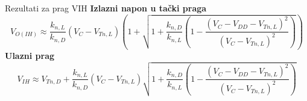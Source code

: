 \begin{frame}[label=09_1-s045]{Rezultati za prag VIH}\setlength{\parskip}{2pt}\setlength{\abovedisplayskip}{4pt}\setlength{\belowdisplayskip}{4pt}\setlength{\abovedisplayshortskip}{3pt}\setlength{\belowdisplayshortskip}{3pt}
\textbf{Izlazni napon u tački praga}\[V_{O(IH)}\approx\frac{k_{n,L}}{k_{n,D}}(V_C-V_{Tn,L})\left(1+\sqrt{1+\frac{k_{n,D}}{k_{n,L}}\left(1-\frac{(V_C-V_{DD}-V_{Tn,L})^2}{(V_C-V_{Tn,L})^2}\right)}\right)\]
\bigskip\textbf{Ulazni prag}\[V_{IH}\approx V_{Tn,D}+\frac{k_{n,L}}{k_{n,D}}(V_C-V_{Tn,L})\sqrt{1+\frac{k_{n,D}}{k_{n,L}}\left(1-\frac{(V_C-V_{DD}-V_{Tn,L})^2}{(V_C-V_{Tn,L})^2}\right)}\]

\end{frame}
